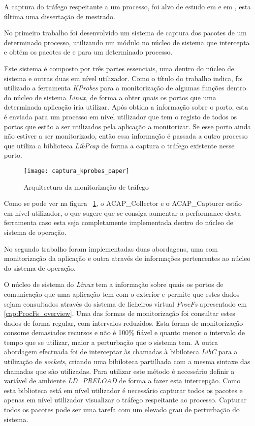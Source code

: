 A captura do tráfego respeitante a um processo, foi alvo de estudo em \cite{1688981} e em \cite{Farruca:2009}, esta última uma dissertação de mestrado. 

No primeiro trabalho foi desenvolvido um sistema de captura dos pacotes de um determinado processo, utilizando um módulo no núcleo de sistema que intercepta e obtém os pacotes de e para um determinado processo.

Este sistema é composto por três partes essenciais, uma dentro do núcleo de sistema e outras duas em nível utilizador.
Como o título do trabalho indica, foi utilizado a ferramenta \textit{KProbes} para a monitorização de algumas funções dentro do núcleo de sistema \textit{Linux}, de forma a obter quais os portos que uma determinada aplicação iria utilizar.
Após obtida a informação sobre o porto, esta é enviada para um processo em nível utilizador que tem o registo de todos os portos que estão a ser utilizados pela aplicação a monitorizar.
Se esse porto ainda não estiver a ser monitorizado, então essa informação é passada a outro processo que utiliza a biblioteca \textit{LibPcap} de forma a captura o tráfego existente nesse porto.


\begin{figure}[h!]
       \centering
       \texttt{[image: captura\_kprobes\_paper]}
       \caption{Arquitectura da monitorização de tráfego}
	\label{fig:paper_capture_kprobes}
\end{figure}


Como se pode ver na figura ~\ref{fig:paper_capture_kprobes}, o ACAP\_Collector e o ACAP\_Capturer estão em nível utilizador, o que sugere que se consiga aumentar a performance desta ferramenta caso esta seja completamente implementada dentro do núcleo de sistema de operação.

No segundo trabalho foram implementadas duas abordagens, uma com monitorização da aplicação e outra através de informações pertencentes ao núcleo do sistema de operação.

O núcleo de sistema do \textit{Linux} tem a informação sobre quais os portos de comunicação que uma aplicação tem com o exterior e permite que estes dados sejam consultados através do sistema de ficheiros virtual \textit{ProcFs} apresentado em \ref{cap:ProcFs_overview}.
Uma das formas de monitorização foi consultar estes dados de forma regular, com intervalos reduzidos.
Esta forma de monitorização consome demasiados recursos e não é 100\% fiável e quanto menor o intervalo de tempo que se utilizar, maior a perturbação que o sistema tem.
A outra abordagem efectuada foi de interceptar às chamadas à bibiloteca \textit{LibC} para a utilização de \textit{sockets}, criando uma bibiloteca partilhada com a mesma sintaxe das chamadas que são utilizadas.
Para utilizar este método é necessário definir a variável de ambiente \textit{LD\_PRELOAD} de forma a fazer esta intercepção.
Como esta biblioteca está em nível utilizador é necessário capturar todos os pacotes e apenas em nível utilizador visualizar o tráfego respeitante ao processo.
Capturar todos os pacotes pode ser uma tarefa com um elevado grau de perturbação do sistema. 

